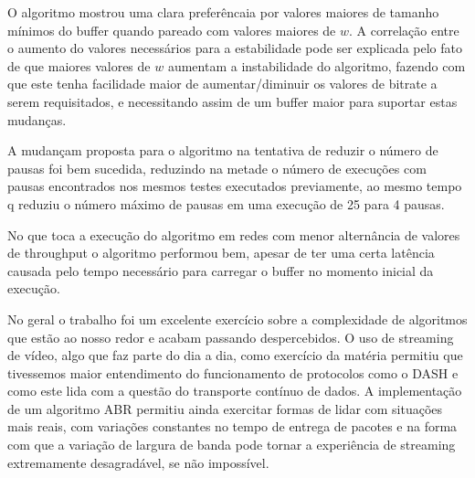 \documentclass[10pt,twocolumn,letterpaper]{article}
\begin{document}
	O algoritmo mostrou uma clara preferêncaia por valores maiores de tamanho mínimos do buffer quando pareado com valores maiores de $w$. A correlação entre o aumento do valores necessários para a estabilidade pode ser explicada pelo fato de que maiores valores de $w$ aumentam a instabilidade do algoritmo, fazendo com que este tenha facilidade maior de aumentar/diminuir os valores de bitrate a serem requisitados, e necessitando assim de um buffer maior para suportar estas mudanças. 
	
	A mudançam proposta para o algoritmo na tentativa de reduzir o número de pausas foi bem sucedida, reduzindo na metade o número de execuções com pausas encontrados nos mesmos testes executados previamente, ao mesmo tempo q reduziu o número máximo de pausas em uma execução de 25 para 4 pausas. 
	
	No que toca a execução do algoritmo em redes com menor alternância de valores de throughput o algoritmo performou bem, apesar de ter uma certa latência causada pelo tempo necessário para carregar o buffer no momento inicial da execução. 
	
	No geral o trabalho foi um excelente exercício sobre a complexidade de algoritmos que estão ao nosso redor e acabam passando despercebidos. O uso de streaming de vídeo, algo que faz parte do dia a dia, como exercício da matéria permitiu que tivessemos maior entendimento do funcionamento de protocolos como o DASH e como este lida com a questão do transporte contínuo de dados. A implementação de um algoritmo ABR permitiu ainda exercitar formas de lidar com situações mais reais, com variações constantes no tempo de entrega de pacotes e na forma com que a variação de largura de banda pode tornar a experiência de streaming extremamente desagradável, se não impossível.
	
	{\small
		
		
	}
	
\end{document}
